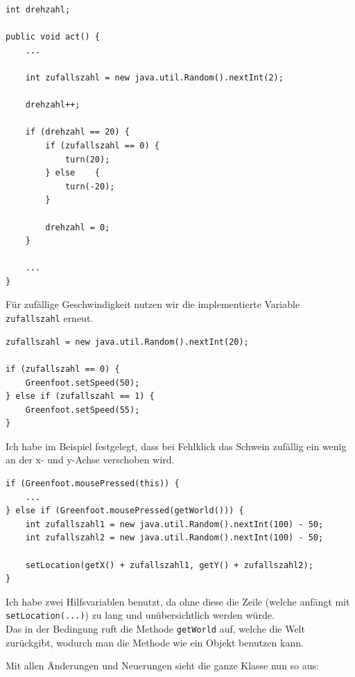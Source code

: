 \documentclass{scrartcl}   %
\begin{document}
\begin{itemize}
    \barrow
    \begin{lstlisting}
int drehzahl;

public void act() {
    ...

    int zufallszahl = new java.util.Random().nextInt(2);
    
    drehzahl++;

    if (drehzahl == 20) {
        if (zufallszahl == 0) {
            turn(20);
        } else    {
            turn(-20);
        }
        
        drehzahl = 0;
    }
    
    ...
}
    \end{lstlisting}
    \barrow Für zufällige Geschwindigkeit nutzen wir die implementierte Variable \texttt{zufallszahl} erneut.
    \begin{lstlisting}
zufallszahl = new java.util.Random().nextInt(20);
    
if (zufallszahl == 0) {
    Greenfoot.setSpeed(50);
} else if (zufallszahl == 1) {
    Greenfoot.setSpeed(55);
}
    \end{lstlisting}
    \barrow Ich habe im Beispiel festgelegt, dass bei Fehlklick das Schwein zufällig ein wenig an der x- und y-Achse verschoben wird.\\
    \begin{lstlisting}
if (Greenfoot.mousePressed(this)) {
    ...
} else if (Greenfoot.mousePressed(getWorld())) {
    int zufallszahl1 = new java.util.Random().nextInt(100) - 50;
    int zufallszahl2 = new java.util.Random().nextInt(100) - 50;
    
    setLocation(getX() + zufallszahl1, getY() + zufallszahl2);
}
    \end{lstlisting}
    Ich habe zwei Hilfsvariablen benutzt, da ohne diese die Zeile (welche anfängt mit \texttt{setLocation(...)}) zu lang und unübersichtlich werden würde.\\
    Das  in der Bedingung ruft die Methode \texttt{getWorld} auf, welche die Welt zurückgibt, wodurch man die Methode wie ein Objekt benutzen kann.\\
\end{itemize}

Mit allen Änderungen und Neuerungen sieht die ganze Klasse nun so aus:
\end{document}
